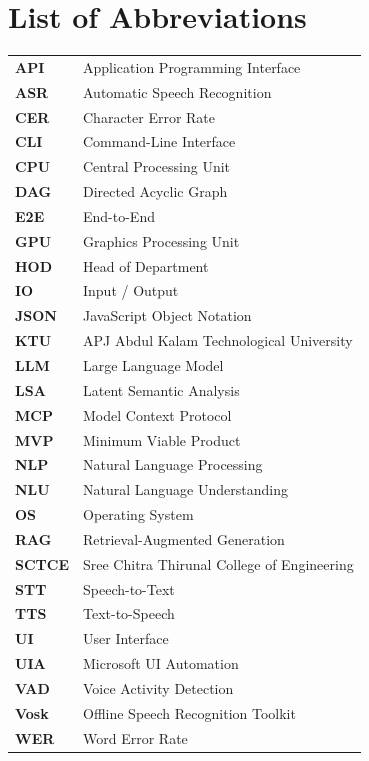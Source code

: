 \chapter*{List of Abbreviations}
%

\begin{singlespace}
\begin{longtable}{p{2.5cm} p{11.5cm}}
\textbf{API} & Application Programming Interface \\
\textbf{ASR} & Automatic Speech Recognition \\
\textbf{CER} & Character Error Rate \\
\textbf{CLI} & Command-Line Interface \\
\textbf{CPU} & Central Processing Unit \\
\textbf{DAG} & Directed Acyclic Graph \\
\textbf{E2E} & End-to-End \\
\textbf{GPU} & Graphics Processing Unit \\
\textbf{HOD} & Head of Department \\
\textbf{IO} & Input / Output \\
\textbf{JSON} & JavaScript Object Notation \\
\textbf{KTU} & APJ Abdul Kalam Technological University \\
\textbf{LLM} & Large Language Model \\
\textbf{LSA} & Latent Semantic Analysis \\
\textbf{MCP} & Model Context Protocol \\
\textbf{MVP} & Minimum Viable Product \\
\textbf{NLP} & Natural Language Processing \\
\textbf{NLU} & Natural Language Understanding \\
\textbf{OS} & Operating System \\
\textbf{RAG} & Retrieval-Augmented Generation \\
\textbf{SCTCE} & Sree Chitra Thirunal College of Engineering \\
\textbf{STT} & Speech-to-Text \\
\textbf{TTS} & Text-to-Speech \\
\textbf{UI} & User Interface \\
\textbf{UIA} & Microsoft UI Automation \\
\textbf{VAD} & Voice Activity Detection \\
\textbf{Vosk} & Offline Speech Recognition Toolkit \\
\textbf{WER} & Word Error Rate \\
\end{longtable}
\end{singlespace}
